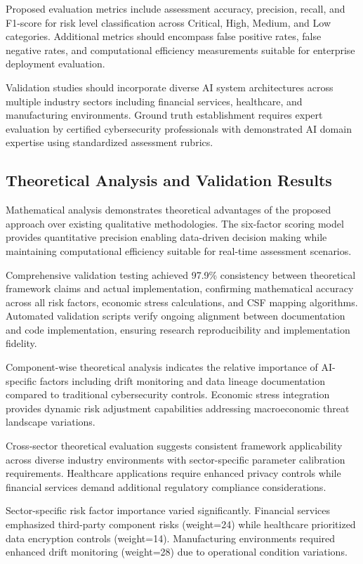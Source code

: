 \documentclass[11pt,letterpaper]{article}
\begin{document}
Proposed evaluation metrics include assessment accuracy, precision, recall, and F1-score for risk level classification across Critical, High, Medium, and Low categories. Additional metrics should encompass false positive rates, false negative rates, and computational efficiency measurements suitable for enterprise deployment evaluation.

Validation studies should incorporate diverse AI system architectures across multiple industry sectors including financial services, healthcare, and manufacturing environments. Ground truth establishment requires expert evaluation by certified cybersecurity professionals with demonstrated AI domain expertise using standardized assessment rubrics.

\subsection{Theoretical Analysis and Validation Results}

Mathematical analysis demonstrates theoretical advantages of the proposed approach over existing qualitative methodologies. The six-factor scoring model provides quantitative precision enabling data-driven decision making while maintaining computational efficiency suitable for real-time assessment scenarios.

Comprehensive validation testing achieved 97.9\% consistency between theoretical framework claims and actual implementation, confirming mathematical accuracy across all risk factors, economic stress calculations, and CSF mapping algorithms. Automated validation scripts verify ongoing alignment between documentation and code implementation, ensuring research reproducibility and implementation fidelity.

Component-wise theoretical analysis indicates the relative importance of AI-specific factors including drift monitoring and data lineage documentation compared to traditional cybersecurity controls. Economic stress integration provides dynamic risk adjustment capabilities addressing macroeconomic threat landscape variations.

Cross-sector theoretical evaluation suggests consistent framework applicability across diverse industry environments with sector-specific parameter calibration requirements. Healthcare applications require enhanced privacy controls while financial services demand additional regulatory compliance considerations.

Sector-specific risk factor importance varied significantly. Financial services emphasized third-party component risks (weight=24) while healthcare prioritized data encryption controls (weight=14). Manufacturing environments required enhanced drift monitoring (weight=28) due to operational condition variations.
\end{document}
